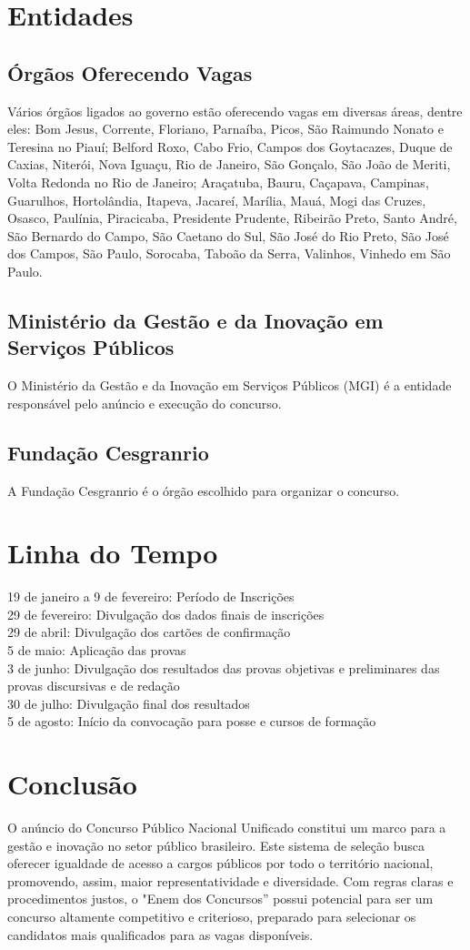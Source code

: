 \documentclass[
   article,       
   12pt,          
   oneside,       
   a4paper,       
   english,       
   brazil,        
   sumario=tradicional
   ]{abntex2}
\begin{document}
\section {Entidades}
\subsection {Órgãos Oferecendo Vagas}
Vários órgãos ligados ao governo estão oferecendo vagas em diversas áreas, dentre eles: Bom Jesus, Corrente, Floriano, Parnaíba, Picos, São Raimundo Nonato e Teresina no Piauí; Belford Roxo, Cabo Frio, Campos dos Goytacazes, Duque de Caxias, Niterói, Nova Iguaçu, Rio de Janeiro, São Gonçalo, São João de Meriti, Volta Redonda no Rio de Janeiro; Araçatuba, Bauru, Caçapava, Campinas, Guarulhos, Hortolândia, Itapeva, Jacareí, Marília, Mauá, Mogi das Cruzes, Osasco, Paulínia, Piracicaba, Presidente Prudente, Ribeirão Preto, Santo André, São Bernardo do Campo, São Caetano do Sul, São José do Rio Preto, São José dos Campos, São Paulo, Sorocaba, Taboão da Serra, Valinhos, Vinhedo em São Paulo.
\subsection {Ministério da Gestão e da Inovação em Serviços Públicos}
O Ministério da Gestão e da Inovação em Serviços Públicos (MGI) é a entidade responsável pelo anúncio e execução do concurso.
\subsection {Fundação Cesgranrio}
A Fundação Cesgranrio é o órgão escolhido para organizar o concurso. 
\section {Linha do Tempo}
19 de janeiro a 9 de fevereiro: Período de Inscrições \\ 
29 de fevereiro: Divulgação dos dados finais de inscrições \\
29 de abril: Divulgação dos cartões de confirmação \\
5 de maio: Aplicação das provas \\
3 de junho: Divulgação dos resultados das provas objetivas e preliminares das provas discursivas e de redação \\
30 de julho: Divulgação final dos resultados \\
5 de agosto: Início da convocação para posse e cursos de formação
\section {Conclusão} 
O anúncio do Concurso Público Nacional Unificado constitui um marco para a gestão e inovação no setor público brasileiro. Este sistema de seleção busca oferecer igualdade de acesso a cargos públicos por todo o território nacional, promovendo, assim, maior representatividade e diversidade. Com regras claras e procedimentos justos, o "Enem dos Concursos” possui potencial para ser um concurso altamente competitivo e criterioso, preparado para selecionar os candidatos mais qualificados para as vagas disponíveis.


\postextual

\end{document}
